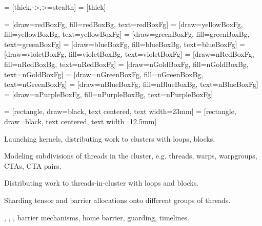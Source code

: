 

 = [thick,->,>=stealth]
 = [thick]

 = [draw=redBoxFg, fill=redBoxBg, text=redBoxFg]
 = [draw=yellowBoxFg, fill=yellowBoxBg, text=yellowBoxFg]
 = [draw=greenBoxFg, fill=greenBoxBg, text=greenBoxFg]
 = [draw=blueBoxFg, fill=blueBoxBg, text=blueBoxFg]
 = [draw=violetBoxFg, fill=violetBoxBg, text=violetBoxFg]
 = [draw=nRedBoxFg, fill=nRedBoxBg, text=nRedBoxFg]
 = [draw=nGoldBoxFg, fill=nGoldBoxBg, text=nGoldBoxFg]
 = [draw=nGreenBoxFg, fill=nGreenBoxBg, text=nGreenBoxFg]
 = [draw=nBlueBoxFg, fill=nBlueBoxBg, text=nBlueBoxFg]
 = [draw=nPurpleBoxFg, fill=nPurpleBoxBg, text=nPurpleBoxFg]

 = [rectangle, draw=black, text centered, text width=23mm]
 = [rectangle, draw=black, text centered, text width=12.5mm]

\newcommand{\qc}[1]{\left\llbracket#1\right\rrbracket}






Launching kernels, distributing work to clusters with  loops,  blocks.


Modeling subdivisions of threads in the cluster, e.g. threads, warps, warpgroups, CTAs, CTA pairs.


Distributing work to threads-in-cluster with  loops and  blocks.


Sharding tensor and barrier allocations onto different groups of threads.


, , , barrier mechanisms, home barrier, guarding, timelines.

